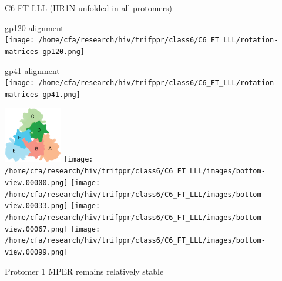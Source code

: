\begin{frame}[fragile]{C6-FT-LLL (HR1N unfolded in all protomers)}
    \begin{center}
        \begin{minipage}{0.47\textwidth}
            \begin{center}
                gp120 alignment\\
                \texttt{[image: /home/cfa/research/hiv/trifppr/class6/C6\_FT\_LLL/rotation-matrices-gp120.png]}
            \end{center}
        \end{minipage}
        \begin{minipage}{0.47\textwidth}
            \begin{center}
                gp41 alignment\\
                \texttt{[image: /home/cfa/research/hiv/trifppr/class6/C6\_FT\_LLL/rotation-matrices-gp41.png]}
            \end{center}
        \end{minipage}

        \includegraphics[width=0.19\textwidth]{trimer_paint_bottom_sodroski_smol.png}
        \texttt{[image: /home/cfa/research/hiv/trifppr/class6/C6\_FT\_LLL/images/bottom-view.00000.png]}
        \texttt{[image: /home/cfa/research/hiv/trifppr/class6/C6\_FT\_LLL/images/bottom-view.00033.png]}
        \texttt{[image: /home/cfa/research/hiv/trifppr/class6/C6\_FT\_LLL/images/bottom-view.00067.png]}
        \texttt{[image: /home/cfa/research/hiv/trifppr/class6/C6\_FT\_LLL/images/bottom-view.00099.png]}

        Protomer 1 MPER remains relatively stable
    \end{center}
\end{frame}

